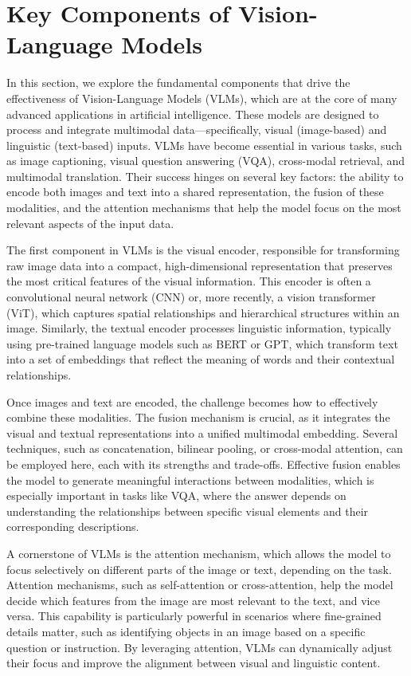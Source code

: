 \chapter{Key Components of Vision-Language Models}




In this section, we explore the fundamental components that drive the effectiveness of Vision-Language Models (VLMs), which are at the core of many advanced applications in artificial intelligence. These models are designed to process and integrate multimodal data—specifically, visual (image-based) and linguistic (text-based) inputs. VLMs have become essential in various tasks, such as image captioning, visual question answering (VQA), cross-modal retrieval, and multimodal translation. Their success hinges on several key factors: the ability to encode both images and text into a shared representation, the fusion of these modalities, and the attention mechanisms that help the model focus on the most relevant aspects of the input data.

The first component in VLMs is the visual encoder, responsible for transforming raw image data into a compact, high-dimensional representation that preserves the most critical features of the visual information. This encoder is often a convolutional neural network (CNN) or, more recently, a vision transformer (ViT), which captures spatial relationships and hierarchical structures within an image. Similarly, the textual encoder processes linguistic information, typically using pre-trained language models such as BERT or GPT, which transform text into a set of embeddings that reflect the meaning of words and their contextual relationships.

Once images and text are encoded, the challenge becomes how to effectively combine these modalities. The fusion mechanism is crucial, as it integrates the visual and textual representations into a unified multimodal embedding. Several techniques, such as concatenation, bilinear pooling, or cross-modal attention, can be employed here, each with its strengths and trade-offs. Effective fusion enables the model to generate meaningful interactions between modalities, which is especially important in tasks like VQA, where the answer depends on understanding the relationships between specific visual elements and their corresponding descriptions.

A cornerstone of VLMs is the attention mechanism, which allows the model to focus selectively on different parts of the image or text, depending on the task. Attention mechanisms, such as self-attention or cross-attention, help the model decide which features from the image are most relevant to the text, and vice versa. This capability is particularly powerful in scenarios where fine-grained details matter, such as identifying objects in an image based on a specific question or instruction. By leveraging attention, VLMs can dynamically adjust their focus and improve the alignment between visual and linguistic content.

